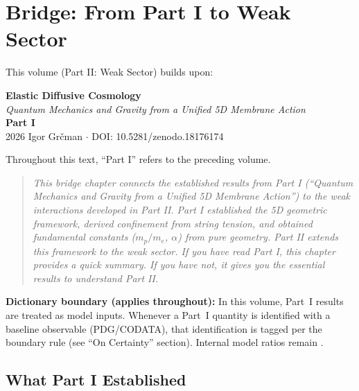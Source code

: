 \chapter{Bridge: From Part I to Weak Sector}
\label{ch:bridge}

\begin{tcolorbox}[colback=blue!5!white, colframe=blue!50!black,
    title=\textbf{Reference to Part I}]
This volume (Part II: Weak Sector) builds upon:

\medskip
\begin{center}
\textbf{Elastic Diffusive Cosmology}\\[2pt]
\textit{Quantum Mechanics and Gravity from a Unified 5D Membrane Action}\\[2pt]
\textbf{Part I}\\[4pt]
{\small \textcopyright{} 2026 Igor Grčman $\cdot$ DOI: 10.5281/zenodo.18176174}
\end{center}

\medskip
Throughout this text, ``Part I'' refers to the preceding volume.
\end{tcolorbox}

\begin{quote}
\textit{This bridge chapter connects the established results from Part I
(``Quantum Mechanics and Gravity from a Unified 5D Membrane Action'') to
the weak interactions developed in Part II. Part I established the 5D
geometric framework, derived confinement from string tension, and obtained
fundamental constants ($m_p/m_e$, $\alpha$) from pure geometry. Part II
extends this framework to the weak sector. If you have read Part I, this
chapter provides a quick summary. If you have not, it gives you the
essential results to understand Part II.}
\end{quote}

\noindent\textbf{Dictionary boundary (applies throughout):}
In this volume, Part~I results are treated as model inputs.
Whenever a Part~I quantity is identified with a baseline observable
(PDG/CODATA), that identification is tagged \tagDc{} per the boundary rule
(see ``On Certainty'' section). Internal model ratios remain \tagDer{}.

\section{What Part I Established}
\label{sec:bridge_book1}

